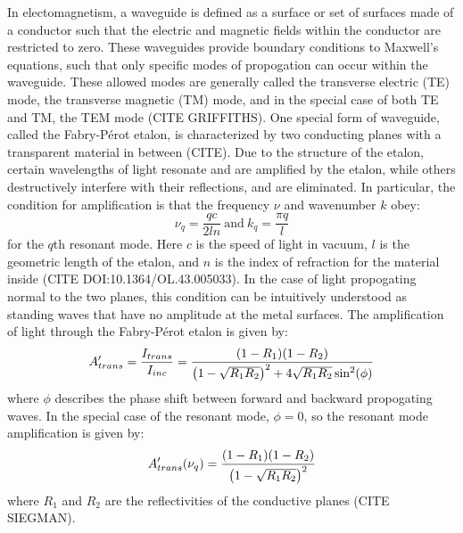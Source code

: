 \documentclass{report}
\begin{document}
        In electomagnetism, a waveguide is defined as a surface or set of surfaces made of a conductor such that the electric and magnetic fields within the conductor are restricted to zero. These waveguides provide boundary conditions to Maxwell's equations, such that only specific modes of propogation can occur within the waveguide. These allowed modes are generally called the transverse electric (TE) mode, the transverse magnetic (TM) mode, and in the special case of both TE and TM, the TEM mode (CITE GRIFFITHS). One special form of waveguide, called the Fabry-P\'erot etalon, is characterized by two conducting planes with a transparent material in between (CITE). Due to the structure of the etalon, certain wavelengths of light resonate and are amplified by the etalon, while others destructively interfere with their reflections, and are eliminated. In particular, the condition for amplification is that the frequency $\nu$ and wavenumber $k$ obey:
        \begin{equation}
            \nu_q=\frac{qc}{2ln}\ \mathrm{and}\ k_q=\frac{\pi q}{l}
        \end{equation}
        for the $q$th resonant mode. Here $c$ is the speed of light in vacuum, $l$ is the geometric length of the etalon, and $n$ is the index of refraction for the material inside (CITE DOI:10.1364/OL.43.005033). In the case of light propogating normal to the two planes, this condition can be intuitively understood as standing waves that have no amplitude at the metal surfaces. The amplification of light through the Fabry-P\'erot etalon is given by:
        \begin{equation}
            A'_{trans}=\frac{I_{trans}}{I_{inc}}=\frac{\qty(1-R_1)\qty(1-R_2)}{\qty(1-\sqrt{R_1R_2})^2+4\sqrt{R_1R_2}\sin^2(\phi)}
        \end{equation}
        where $\phi$ describes the phase shift between forward and backward propogating waves. In the special case of the resonant mode, $\phi=0$, so the resonant mode amplification is given by:
        \begin{equation}
            A'_{trans}\qty(\nu_q)=\frac{\qty(1-R_1)\qty(1-R_2)}{\qty(1-\sqrt{R_1R_2})^2}
        \end{equation}
        where $R_1$ and $R_2$ are the reflectivities of the conductive planes (CITE SIEGMAN).
        
\end{document}
